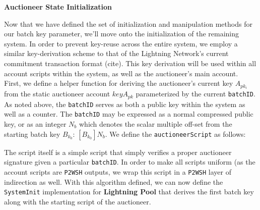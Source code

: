 \documentclass[10pt,a4paper]{article}
\theoremstyle{definition}
\begin{document}
\begin{center}
    \textbf{Auctioneer State Initialization}
\end{center}

Now that we have defined the set of initialization and manipulation methods for
our batch key parameter, we'll move onto the initialization of the remaining
system. In order to prevent key-reuse across the entire system, we employ a
similar key-derivation scheme to that of the Lightning Network's current
commitment transaction format (cite). This key derivation will be used within
all account scripts within the system, as well as the auctioneer's main
account. \\

First, we define a helper function for deriving the auctioneer's current key
$A_{pk_i}$ from the static auctioneer account $key A_{pk}$ parameterized by the
current \texttt{batchID}. As noted above, the \texttt{batchID} serves as both a
public key within the system as well as a counter. The \texttt{batchID} may be
expressed as a normal compressed public key, or as an integer $N_{b}$ which
denotes the scalar multiple off-set from the starting batch key $B_{k_0}$:
$[B_{k_0}]N_{b}$. We define the \texttt{auctioneerScript} as follows: 

\begin{pcvstack}[boxed,center, space=1em]
\end{pcvstack}

The script itself is a simple script that simply verifies a proper auctioneer
signature given a particular \texttt{batchID}. In order to make all scripts
uniform (as the account scripts are \texttt{P2WSH} outputs, we wrap this script
in a \texttt{P2WSH} layer of indirection as well. With this algorithm defined,
we can now define the \texttt{SystemInit} implementation for \textbf{Lightning
Pool} that derives the first batch key along with the starting script of the
auctioneer. \\

\begin{pcvstack}[boxed,center, space=1em]
\end{pcvstack}
\end{document}
